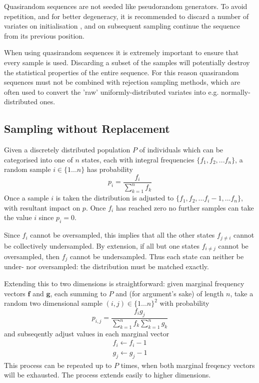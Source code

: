 \documentclass{JASSS}
\begin{document}
Quasirandom sequences are not seeded like pseudorandom generators. To
avoid repetition, and for better degeneracy, it is recommended to
discard a number of variates on initialisation \citep{joe_remark_2003}, and
on subsequent sampling continue the sequence from its previous position.

When using quasirandom sequences it is extremely important to ensure that every sample is used. Discarding a subset of the samples will potentially destroy the statistical properties of the entire sequence. For this reason quasirandom sequences must not be combined with rejection sampling methods, which are often used to convert the 'raw' uniformly-distributed variates into e.g. normally-distributed ones.


\subsection{Sampling without Replacement}\label{sampling-without-replacement}

Given a discretely distributed population \(P\) of individuals which can be categorised into one of \(n\) states, each with integral frequencies
\(\{f_1,f_2,...f_n\}\), a random sample \(i \in \{1...n\}\) has
probability
\begin{equation}
p_i = \frac{f_i}{\sum\limits_{k=1}^{n}f_k}
\end{equation}
Once a sample \(i\) is taken the distribution is adjusted to
\(\{f_1,f_2,...f_i-1,...f_n\}\), with resultant impact on \(p\). Once
\(f_i\) has reached zero no further samples can take the value \(i\)
since \(p_i = 0\).

Since \(f_i\) cannot be oversampled, this implies that all the other
states \(f_{j\neq{i}}\) cannot be collectively undersampled. By extension, if all but
one states \(f_{i\neq{j}}\) cannot be oversampled, then \(f_j\) cannot
be undersampled. Thus each state can neither be under- nor oversampled:
the distribution must be matched exactly.

Extending this to two dimensions is straightforward: given marginal frequency vectors \(\mathbf{f}\) and \(\mathbf{g}\), each summing to \(P\) and (for argument's sake) of length \(n\), take a random two dimensional sample \((i,j) \in \{1...n\}^2\) with probability
\begin{equation}
p_{i,j} = \frac{f_{i}g_{j}}{\sum\limits_{k=1}^{n}f_k\sum\limits_{k=1}^{n}g_k}
\end{equation}
and subseqently adjust values in each marginal vector
\begin{equation}
\begin{split}
f_i \leftarrow f_i-1 \\
g_j \leftarrow g_j-1 
\end{split}
\end{equation} 
This process can be repeated up to \(P\) times, when both marginal freqency vectors will be exhausted. The process extends easily to higher dimensions.
\end{document}

